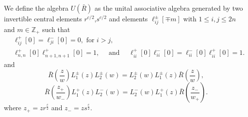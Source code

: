 \documentclass[10pt,a4paper]{amsart}
\numberwithin{equation}{section}
\begin{document}
We define the algebra $U(\bar{R})$ as the unital associative algebra generated by two invertible central elements $r^{c / 2}$,$s^{c / 2}$ and elements $\ell_{i j}^{ \pm}[\mp m]$ with $1 \leqslant i, j \leqslant 2 n$ and $m \in \mathbb{Z}_{+}$ such that
\begin{align*}
&\ell_{i j}^{+}[0]=\ell_{j i}^{-}[0]=0  ,\text { for }  i>j, \\
&\ell_{n, n}^{+}[0] \ell_{n+1, n+1}^{+}[0]=1, \quad \text { and } \quad \ell_{i i}^{+}[0] \ell_{i i}^{-}[0]=\ell_{i i}^{-}[0] \ell_{i i}^{+}[0]=1.
\end{align*}
and
$$
\bar{R}\left(\frac{z}{w}\right) L_1^{ \pm}(z) L_2^{ \pm}(w)=L_2^{ \pm}(w) L_1^{ \pm}(z) \bar{R}\left(\frac{z}{w}\right),
$$
$$
\bar{R}\left(\frac{z_{+}}{w_{-}}\right) L_1^{+}(z) L_2^{-}(w)=L_2^{-}(w) L_1^{+}(z) \bar{R}\left(\frac{z_{-}}{w_{+}}\right).
$$
where $z_{+}=z r^{\frac{c}{2}}$ and $z_{-}=z s^{\frac{c}{2}}.$
\end{document}
